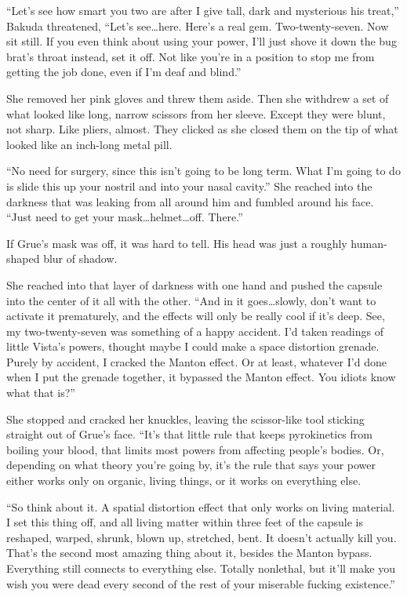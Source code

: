 ``Let's see how smart you two are after I give tall, dark and mysterious his treat,'' Bakuda threatened, ``Let's see\ldots here.  Here's a real gem.  Two-twenty-seven.  Now sit still.  If you even think about using your power, I'll just shove it down the bug brat's throat instead, set it off.  Not like you're in a position to stop me from getting the job done, even if I'm deaf and blind.''



She removed her pink gloves and threw them aside.  Then she withdrew a set of what looked like long, narrow scissors from her sleeve.  Except they were blunt, not sharp.  Like pliers, almost.  They clicked as she closed them on the tip of what looked like an inch-long metal pill.



``No need for surgery, since this isn't going to be long term.  What I'm going to do is slide this up your nostril and into your nasal cavity.''  She reached into the darkness that was leaking from all around him and fumbled around his face. ``Just need to get your mask\ldots helmet\ldots off.  There.''



If Grue's mask was off, it was hard to tell.  His head was just a roughly human-shaped blur of shadow.



She reached into that layer of darkness with one hand and pushed the capsule into the center of it all with the other.  ``And in it goes\ldots slowly, don't want to activate it prematurely, and the effects will only be really cool if it's deep.  See, my two-twenty-seven was something of a happy accident.  I'd taken readings of little Vista's powers, thought maybe I could make a space distortion grenade.  Purely by accident, I cracked the Manton effect.  Or at least, whatever I'd done when I put the grenade together, it bypassed the Manton effect.  You idiots know what that is?''



She stopped and cracked her knuckles, leaving the scissor-like tool sticking straight out of Grue's face.  ``It's that little rule that keeps pyrokinetics from boiling your blood, that limits most powers from affecting people's bodies.  Or, depending on what theory you're going by, it's the rule that says your power either works only on organic, living things, or it works on everything else.



``So think about it.  A spatial distortion effect that only works on living material.  I set this thing off, and all living matter within three feet of the capsule is reshaped, warped, shrunk, blown up, stretched, bent.  It doesn't actually kill you.  That's the second most amazing thing about it, besides the Manton bypass.  Everything still connects to everything else.  Totally nonlethal, but it'll make you wish you were dead every second of the rest of your miserable fucking existence.''



